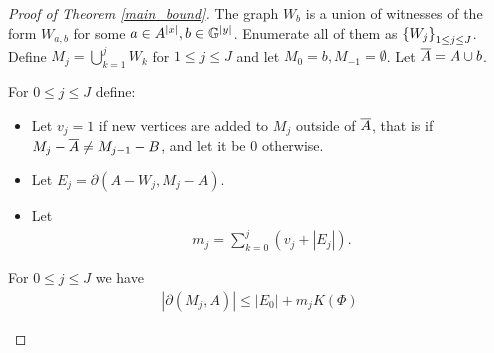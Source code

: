 \begin{proof} [Proof of Theorem \ref{main_bound}]
  The graph $W_b$ is a union of witnesses of the form $W_{a,b}$ for some $a \in A^{|x|}, b \in \mathbb G^{|y|}$.
  Enumerate all of them as $\left\{W_j\right\}_{1 \leq j \leq J}$.
  Define $M_j = \bigcup_{k=1}^j W_{k}$ for $1 \leq j \leq J$ and let $M_0 = b, M_{-1} = \emptyset$.
  Let $\overline{A} = A \cup b$.
  \begin{Definition}
    For $0 \leq j \leq J$ define:
    \begin{itemize}
    \item Let $v_j = 1$ if new vertices are added to $M_j$ outside of $\overline{A}$, that is if
      $M_j - \overline{A} \neq M_{j-1} - B$,
      and let it be $0$ otherwise.
    \item Let %
      $E_j = \partial(A - W_j, M_j - A)$.
    \item Let
      \begin{align*}
        m_j = \sum_{k = 0}^j (v_j + |E_j|).
      \end{align*}
    \end{itemize}
  \end{Definition}

  \begin{Lemma} \label{ubd_lemma}
    For $0 \leq j \leq J$ we have
    \begin{align*}
      |\partial(M_j, A)| \leq |E_0| + m_j K(\Phi) 
    \end{align*}
  \end{Lemma}


\end{proof}

